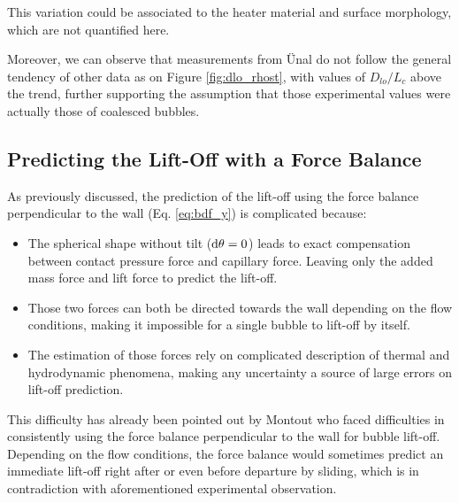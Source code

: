 \begin{remark*}{}
This variation could be associated to the heater material and surface morphology, which are not quantified here.
\end{remark*}

Moreover, we can observe that measurements from \"Unal do not follow the general tendency of other data as on Figure \ref{fig:dlo_rhost}, with values of $D_{lo}/L_{c}$ above the trend, further supporting the assumption that those experimental values were actually those of coalesced bubbles.



\subsection{Predicting the Lift-Off with a Force Balance}

As previously discussed, the prediction of the lift-off using the force balance perpendicular to the wall (Eq. \ref{eq:bdf_y}) is complicated because:

\begin{itemize}
\item The spherical shape without tilt ($\mathrm{d}\theta = 0$) leads to exact compensation between contact pressure force and capillary force. Leaving only the added mass force and lift force to predict the lift-off.

\item Those two forces can both be directed towards the wall depending on the flow conditions, making it impossible for a single bubble to lift-off by itself.

\item The estimation of those forces rely on complicated description of thermal and hydrodynamic phenomena, making any uncertainty a source of large errors on lift-off prediction.
\end{itemize}

This difficulty has already been pointed out by Montout \cite{montout_contribution_2009} who faced difficulties in consistently using the force balance perpendicular to the wall for bubble lift-off. Depending on the flow conditions, the force balance would sometimes predict an immediate lift-off right after or even before departure by sliding, which is in contradiction with aforementioned experimental observation.

\npar



